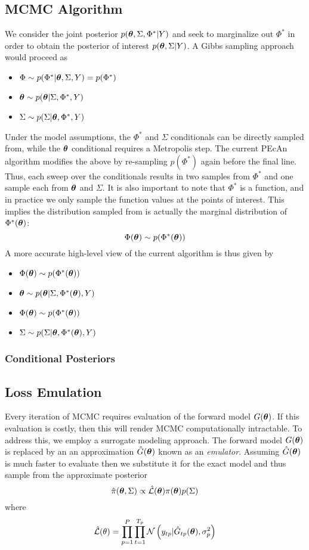 \documentclass[12pt]{article}
\begin{document}
\subsection{MCMC Algorithm}
We consider the joint posterior $p(\boldsymbol{\theta}, \Sigma, \Phi^*|Y)$ and seek to marginalize out $\Phi^*$ in order to obtain the posterior of interest $p(\boldsymbol{\theta}, \Sigma|Y)$. A Gibbs sampling approach would proceed as 
\begin{itemize}
\item $\Phi \sim p(\Phi^*|\boldsymbol{\theta}, \Sigma, Y) = p(\Phi^*)$
\item $\boldsymbol{\theta} \sim p(\boldsymbol{\theta}|\Sigma, \Phi^*, Y)$
\item $\Sigma \sim p(\Sigma|\boldsymbol{\theta}, \Phi^*, Y)$
\end{itemize}
Under the model assumptions, the $\Phi^*$ and $\Sigma$ conditionals can be directly sampled from, while the $\boldsymbol{\theta}$ conditional requires a Metropolis step. The current PEcAn algorithm modifies the above by re-sampling 
$p(\Phi^*)$ again before the final line. Thus, each sweep over the conditionals results in two samples from $\Phi^*$ and one sample each from $\boldsymbol{\theta}$ and $\Sigma$. It is also important to note that 
$\Phi^*$ is a function, and in practice we only sample the function values at the points of interest. This implies the distribution sampled from is actually the marginal distribution of $\Phi^*(\boldsymbol{\theta})$:
\[\Phi(\boldsymbol{\theta}) \sim p(\Phi^*(\boldsymbol{\theta}))\]
A more accurate high-level view of the current algorithm is thus given by 
\begin{itemize}
\item $\Phi(\boldsymbol{\theta}) \sim p(\Phi^*(\boldsymbol{\theta}))$
\item $\boldsymbol{\theta} \sim p(\boldsymbol{\theta}|\Sigma, \Phi^*(\boldsymbol{\theta}), Y)$
\item $\Phi(\boldsymbol{\theta}) \sim p(\Phi^*(\boldsymbol{\theta}))$
\item $\Sigma \sim p(\Sigma|\boldsymbol{\theta}, \Phi^*(\boldsymbol{\theta}), Y)$
\end{itemize}

\subsubsection{Conditional Posteriors}

\subsection{Loss Emulation}
Every iteration of MCMC requires evaluation of the forward model $G(\boldsymbol{\theta})$. If this evaluation is costly, then this will render MCMC computationally intractable. To address this, we employ a surrogate modeling approach. 
The forward model $G(\boldsymbol{\theta})$ is replaced by an an approximation $\hat{G}(\boldsymbol{\theta})$ known as an \textit{emulator}. Assuming $\hat{G}(\boldsymbol{\theta})$ is much faster to evaluate then we substitute it for the exact model and thus 
sample from the approximate posterior
 \[\hat{\pi}(\boldsymbol{\theta}, \Sigma) \propto \hat{\mathcal{L}}(\boldsymbol{\theta})\pi(\boldsymbol{\theta})p(\Sigma)\]
 where 
 \begin{align*}
\hat{\mathcal{L}}(\theta) = \prod_{p = 1}^{P} \prod_{t = 1}^{T_{p}} \mathcal{N}\left(y_{tp}| \hat{G}_{tp}(\boldsymbol{\theta}), \sigma_p^2 \right)
\end{align*}
 
\end{document}
